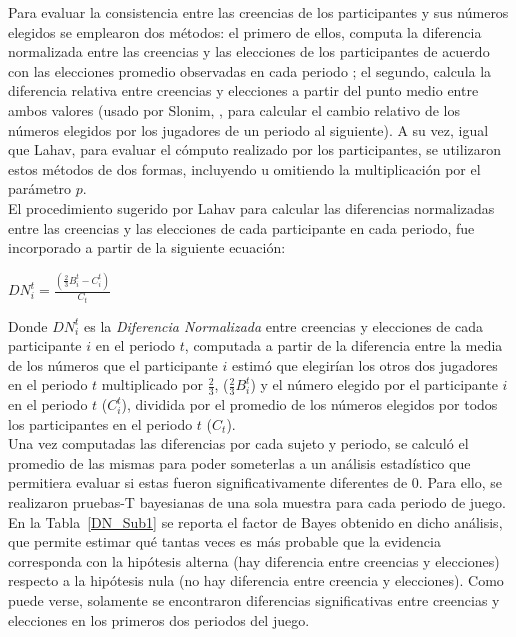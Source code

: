 Para evaluar la consistencia entre las creencias de los participantes y sus números elegidos se emplearon dos métodos: el primero de ellos, computa la diferencia normalizada entre las creencias y las elecciones de los participantes de acuerdo con las elecciones promedio observadas en cada periodo \parencite{Lahav2015}; el segundo, calcula la diferencia relativa entre creencias y elecciones a partir del punto medio entre ambos valores (usado por Slonim, \parencite*{Slonim2005}, para calcular el cambio relativo de los números elegidos por los jugadores de un periodo al siguiente). A su vez, igual que Lahav, para evaluar el cómputo realizado por los participantes, se utilizaron estos métodos de dos formas,  incluyendo u omitiendo la multiplicación por el parámetro $p$.\\

El procedimiento sugerido por Lahav \parencite*{Lahav2015} para calcular las diferencias normalizadas entre las creencias y las elecciones de cada participante en cada periodo, fue incorporado a partir de la siguiente ecuación:\\

\begin{center}
$DN_i^t = \frac{(\frac{2}{3}B_i^t - C_i^t)}{C_t}$\\
\end{center}

Donde $DN_i^t$ es la \textit{Diferencia Normalizada} entre creencias y elecciones de cada participante $i$ en el periodo $t$, computada a partir de la diferencia entre  la media de los números que el participante $i$ estimó que elegirían los otros dos jugadores en el periodo $t$ multiplicado por $\frac{2}{3}$,  ($\frac{2}{3}B_i^t$) y el número elegido por el participante $i$ en el periodo $t$ ($C_i^t$), dividida por el promedio de los números elegidos por todos los participantes en el periodo $t$ ($C_t$).\\

Una vez computadas las diferencias por cada sujeto y periodo, se calculó el promedio de las mismas para poder someterlas a un análisis estadístico que permitiera evaluar si estas fueron significativamente diferentes de $0$. Para ello, se realizaron pruebas-T bayesianas de una sola muestra para cada periodo de juego. En la Tabla~\ref{DN_Sub1} se reporta el factor de Bayes obtenido en dicho análisis, que permite estimar qué tantas veces es más probable que la evidencia corresponda con la hipótesis alterna (hay diferencia entre creencias y elecciones) respecto a la hipótesis nula (no hay diferencia entre creencia y elecciones). Como puede verse, solamente se encontraron diferencias significativas entre creencias y elecciones en los primeros dos periodos del juego.\\

